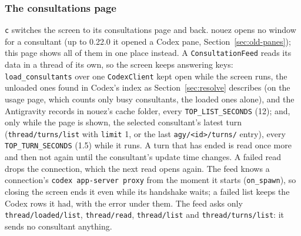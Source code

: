 \documentclass[10pt,a4paper]{article}
\newcommand{\code}[1]{\texttt{#1}}
\begin{document}
\subsubsection*{The consultations page}
\label{sec:consultations-page}

\code{c} switches the screen to its consultations page and back. nouez opens no window for a
consultant (up to 0.22.0 it opened a Codex pane, Section~\ref{sec:old-panes}); this page shows all of
them in one place instead. A \code{ConsultationFeed} reads its data in a thread of its own, so the
screen keeps answering keys: \code{load\_consultants} over one \code{CodexClient} kept open while the
screen runs, the unloaded ones found in Codex's index as Section~\ref{sec:resolve} describes (on
the usage page, which counts only busy consultants, the loaded ones alone), and the Antigravity
records in nouez's cache folder, every \code{TOP\_LIST\_SECONDS}
(12); and, only while the page is shown, the selected consultant's latest turn
(\code{thread/turns/list} with \code{limit} 1, or the last \code{agy/<id>/turns/} entry), every
\code{TOP\_TURN\_SECONDS} (1.5) while it runs. A turn that has ended is read once more and then not
again until the consultant's update time changes. A failed read drops the connection, which the next
read opens again. The feed knows a connection's \code{codex app-server proxy} from the moment it
starts (\code{on\_spawn}), so closing the screen ends it even while its handshake waits; a failed list keeps the Codex rows it had, with the error under them. The feed asks only
\code{thread/loaded/list}, \code{thread/read}, \code{thread/list} and \code{thread/turns/list}: it
sends no consultant anything.
\end{document}
